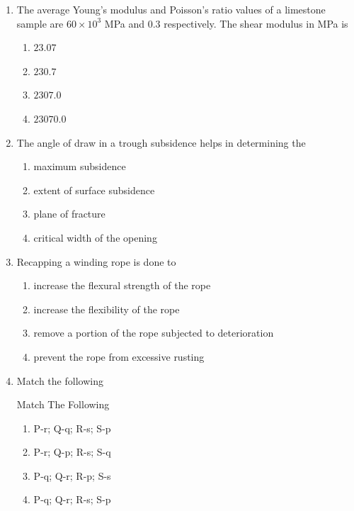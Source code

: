 \documentclass[journal,12pt,onecolumn]{IEEEtran}
\theoremstyle{remark}
\begin{document}
\begin{enumerate}
 \item The average Young's modulus and Poisson's ratio values of a limestone sample are $60 \times 10^3$ MPa and $0.3$ respectively. The shear modulus in MPa is
\hfill{}
\begin{multicols}{4}
\begin{enumerate}
\item $23.07$
\item $230.7$
\item $2307.0$
\item $23070.0$
\end{enumerate}
\end{multicols}

\item The angle of draw in a trough subsidence helps in determining the

\hfill{}
\begin{multicols}{2}
\begin{enumerate}
\item maximum subsidence
\item extent of surface subsidence
\item plane of fracture
\item critical width of the opening
\end{enumerate}
\end{multicols}

\item Recapping a winding rope is done to

\hfill{}
\begin{enumerate}
\item increase the flexural strength of the rope
\item increase the flexibility of the rope
\item remove a portion of the rope subjected to deterioration
\item  prevent the rope from excessive rusting
\end{enumerate}

\item Match the following
\vspace{0.5em}

\hfill{}
\begin{table}[H]
  \centering
  \caption{Match The Following}
  
  \label{tab:Table1}
\end{table}
\begin{multicols}{2}
\begin{enumerate}
\item P-r; Q-q; R-s; S-p  
\item P-r; Q-p; R-s; S-q  
\item P-q; Q-r; R-p; S-s  
\item P-q; Q-r; R-s; S-p  
\end{enumerate}
\end{multicols}


\end{enumerate}
\end{document}
